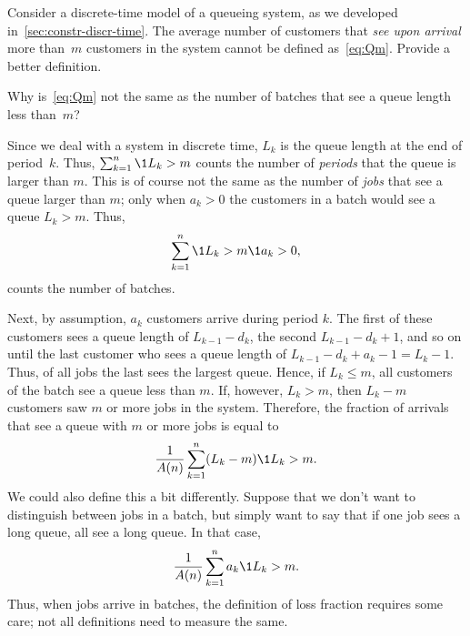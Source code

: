 \begin{exercise}
 Consider a discrete-time model of a queueing system, as we developed in~\cref{sec:constr-discr-time}.
 The average number of customers that \emph{see upon arrival} more than~$m$ customers in the system cannot be defined as~\cref{eq:Qm}.
 Provide a better definition.
\begin{hint}
 Why is~\cref{eq:Qm} not the same as the number of batches that see a queue length less than~$m$?
\end{hint}
\begin{solution} Since we deal with a system in discrete time, $L_k$ is the queue length at the end of period~$k$.
 Thus, $\sum_{k=1}^n \1{L_k > m}$ counts the number of \emph{periods} that the queue is larger than $m$.
 This is of course not the same as the number of \emph{jobs} that see a queue larger than $m$; only when $a_k>0$ the customers in a batch would see a queue $L_k>m$.
 Thus,
 \begin{equation*}
 \sum_{k=1}^n \1{L_k > m} \1{a_k > 0},
 \end{equation*}
 counts the number of batches. 

 Next, by assumption, $a_k$ customers arrive during period $k$.
 The first of these customers sees a queue length of $L_{k-1} - d_k$, the second $L_{k-1}-d_k + 1$, and so on until the last customer who sees a queue length of $L_{k-1} - d_k + a_k -1 = L_k -1$.
 Thus, of all jobs the last sees the largest queue.
 Hence, if $L_k \leq m$, all customers of the batch see a queue less than $m$.
 If, however, $L_k > m$, then $L_k -m$ customers saw $m$ or more jobs in the system.
 Therefore, the fraction of arrivals that see a queue with $m$ or more jobs is equal to
\begin{equation*}
 \frac 1 {A(n)} \sum_{k=1}^n (L_k - m) \1{L_k > m} .
\end{equation*}
We could also define this a bit differently.
Suppose that we don't want to distinguish between jobs in a batch, but simply want to say that if one job sees a long queue, all see a long queue.
In that case,
\begin{equation*}
\frac 1{A(n)}\sum_{k=1}^n a_k \1{L_k > m}.
\end{equation*}
Thus, when jobs arrive in batches, the definition of loss fraction requires some care; not all definitions need to measure the same.
\end{solution}
\end{exercise}






 




